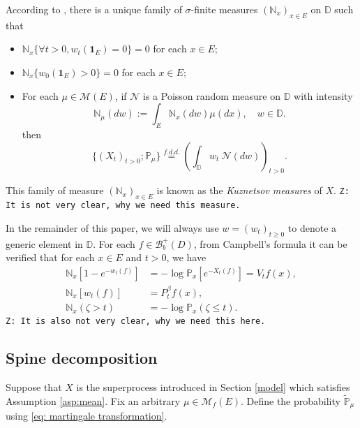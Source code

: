 \documentclass[12pt,a4paper]{amsart}
\numberwithin{equation}{section}
\theoremstyle{plain}
\theoremstyle{definition}
\theoremstyle{remark}
\begin{document}
	According to \cite[Section 8.4]{Li2011Measure-valued}, there is a unique family of $\sigma$-finite measures $(\mathbb N_x)_{x\in E}$ on $\mathbb D$ such that
\begin{itemize}
\item
    $\mathbb N_x \{\forall t > 0, w_t(\mathbf 1_E)=0\} =0$ for each $x\in E$;
\item
    $\mathbb N_x \{ w_0(\mathbf 1_E) > 0\} = 0$ for each $x\in E$;
\item
    For each $\mu \in \mathcal M(E)$, if $\mathcal N$ is a Poisson random measure on $\mathbb D$ with intensity
\[
	\mathbb N_\mu(dw):= \int_E \mathbb N_x(dw)\mu(dx), \quad w\in \mathbb D.
\]
	then
\[
	\{(X_t)_{t> 0};\mathbb P_\mu\}
	\overset{f.d.d.}{=} \left(\int_{\mathbb D} w_t~\mathcal N(dw)\right)_{t> 0}.
\]
\end{itemize}
	This family of measure $(\mathbb N_x)_{x\in E}$ is known as the \emph{Kuznetsov measures} of $X$.
	{\tt Z: It is not very clear, why we need this measure.}

	In the remainder of this paper, we will always use $w = (w_t)_{t\geq 0}$ to denote a generic element in $\mathbb D$.
	For each $f\in \mathcal B_b^+(D)$, from Campbell's formula it can be verified that for each $x\in E$ and $t>0$, we have
\begin{align}\label{eq: kuznetsov Laplace}
 	\mathbb N_x[1-e^{-w_t(f) }]
 	&=-\log \mathbb P_x[e^{-X_t(f)}] = V_t f(x),
 	\\ \mathbb N_x[w_t(f)]
 	&=P_t^{\beta}f(x),
 	\\
 \mathbb N_x(\zeta > t) &= - \log \mathbb P_x(\zeta \leq t).
\end{align}
	{\tt Z: It is also not very clear, why we need this here.}


\subsection{Spine decomposition}
    Suppose that $X$ is the superprocess introduced in Section \ref{model} which satisfies Assumption \ref{asp:mean}.   Fix an arbitrary $\mu\in \mathcal M_f(E)$.  Define the probability $\widetilde {\mathbb P}_\mu$ using \eqref{eq: martingale transformation}.
\end{document}
